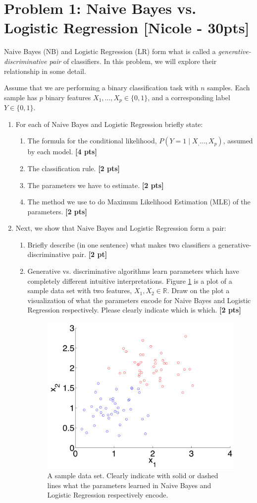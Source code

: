 \section*{Problem 1: Naive Bayes vs. Logistic Regression [Nicole - 30pts]}

Naive Bayes (NB) and Logistic Regression (LR) form what is called a \textit{generative-discriminative pair} of classifiers. In this problem, we will explore their relationship in some detail.

Assume that we are performing a binary classification task with $n$ samples. Each sample has $p$ binary features $X_1,\hdots,X_p \in \{0,1\}$, and a corresponding label $Y \in \{0,1\}$.
\begin{enumerate}
\item
    For each of Naive Bayes and Logistic Regression briefly state: 
	\begin{enumerate}
	\item 
	The formula for the conditional likelihood, $P(Y = 1\mid X_,\hdots,X_p)$, assumed by each model. 
	{\bf [4 pts]}
	\item 
	The classification rule.
	{\bf [2 pts]}
	\item 
	The parameters we have to estimate.
	{\bf [2 pts]}
	\item 
	The method we use to do Maximum Likelihood Estimation (MLE) of the parameters. 
	{\bf [2 pts]}
	\end{enumerate}
\item
Next, we show that Naive Bayes and Logistic Regression form a pair: 
	\begin{enumerate}
	\item 
	Briefly describe (in one sentence) what makes two classifiers a generative-discriminative pair. 
	{\bf [2 pt]}
	\item 
	Generative vs. discriminative algorithms learn parameters which have completely different intuitive interpretations. Figure \ref{fig:sampledata} is a plot of a sample data set with two features, $X_1, X_2 \in \mathbb{R}$. Draw on the plot a visualization of what the parameters encode for Naive Bayes and Logistic Regression respectively. Please clearly indicate which is which.
	{\bf [2 pts]}
	
		\begin{figure}[ht]
	\centering
	\includegraphics[width = 0.5\linewidth]{pics/gaussian_lr_nb.pdf}
	\caption{A sample data set. Clearly indicate with solid or dashed lines what the parameters learned in Naive Bayes and Logistic Regression respectively encode.}
	\label{fig:sampledata}
	\end{figure}


\end{enumerate}
\end{enumerate}
